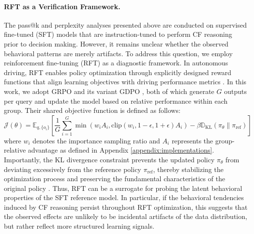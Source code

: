 \documentclass{article}
\begin{document}
\paragraph{RFT as a Verification Framework.}
The pass@k and perplexity analyses presented above are conducted on supervised fine-tuned (SFT) models that are instruction-tuned to perform CF reasoning prior to decision making. However, it remains unclear whether the observed behavioral patterns are merely artifacts. To address this question, we employ reinforcement fine-tuning (RFT) as a diagnostic framework. In autonomous driving, RFT enables policy optimization through explicitly designed reward functions that align learning objectives with driving performance metrics \cite{e2e-vlm:autovla, e2e-vlm:alphadrive, e2e-vlm:autodrive-r2, causal:e2e-vlm:alpamayo}. In this work, we adopt GRPO \cite{rlvr:grpo} and its variant GDPO \cite{rlvr:gdpo}, both of which generate $G$ outputs per query and update the model based on relative performance within each group. Their shared objective function is defined as follows:
$$\mathcal{J}(\theta) = \mathbb{E}_{q, \{o_i\}} \left[ \frac{1}{G} \sum_{i=1}^{G} \min \left( w_i A_i, \text{clip}(w_i, 1-\epsilon, 1+\epsilon) A_i \right) - \beta \mathbb{D}_{\mathrm{KL}}(\pi_\theta \| \pi_{\text{ref}}) \right]$$
where $w_i$ denotes the importance sampling ratio and $A_i$ represents the group-relative advantage as defined in Appendix \ref{appendix:implementations}. Importantly, the KL divergence constraint prevents the updated policy $\pi_\theta$ from deviating excessively from the reference policy $\pi_{\text{ref}}$, thereby stabilizing the optimization process and preserving the fundamental characteristics of the original policy \cite{limit-rlvr:does, limit-rlvr:echo_chamber, limit-rlvr:rethinking-reflection}. Thus, RFT can be a surrogate for probing the latent behavioral properties of the SFT reference model. In particular, if the behavioral tendencies induced by CF reasoning persist throughout RFT optimization, this suggests that the observed effects are unlikely to be incidental artifacts of the data distribution, but rather reflect more structured learning signals.
\end{document}
